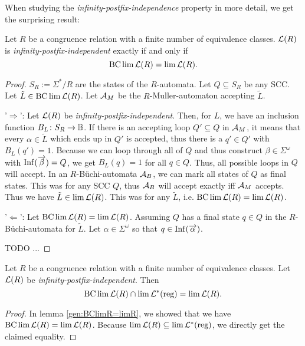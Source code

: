 When studying the \emph{infinity-postfix-independence} property in more detail, we get the surprising result:

\begin{lemma}
\label{gen:BClimR=limR}
Let $R$ be a congruence relation with a finite number of equivalence classes. $\mathcal{L}(R)$ is \emph{infinity-postfix-independent} exactly if and only if
\[ \operatorname{BC} \lim \mathcal{L}(R) = \lim \mathcal{L}(R) . \]
\begin{proof}
$S_R := \Sigma^*/R$ are the states of the $R$-automata. Let $Q \subseteq S_R$ be any SCC. Let $\tilde L \in \operatorname{BC} \lim \mathcal{L}(R)$. Let $\mathcal{A}_M$ be the $R$-Muller-automaton accepting $\tilde L$.

'$\Rightarrow$': Let $\mathcal{L}(R)$ be \emph{infinity-postfix-independent}. Then, for $L$, we have an inclusion function $B_L \colon S_R \rightarrow \mathbb{B}$. If there is an accepting loop $Q' \subseteq Q$ in $\mathcal{A}_M$, it means that every $\alpha \in \tilde L$ which ends up in $Q'$ is accepted, thus there is a $q' \in Q'$ with $B_L(q') = 1$. Because we can loop through all of $Q$ and thus construct $\beta \in \Sigma^\omega$ with $\operatorname{Inf}(\overrightarrow \beta) = Q$, we get $B_L(q) = 1$ for all $q \in Q$. Thus, all possible loops in $Q$ will accept. In an $R$-Büchi-automata $\mathcal{A}_B$, we can mark all states of $Q$ as final states. This was for any SCC $Q$, thus $\mathcal{A}_B$ will accept exactly iff $\mathcal{A}_M$ accepts. Thus we have $\tilde L \in \lim \mathcal{L}(R)$. This was for any $\tilde L$, i.e. $\operatorname{BC} \lim \mathcal{L}(R) = \lim \mathcal{L}(R)$.

'$\Leftarrow$': Let $\operatorname{BC} \lim \mathcal{L}(R) = \lim \mathcal{L}(R)$. Assuming $Q$ has a final state $q \in Q$ in the $R$-Büchi-automata for $\tilde L$. Let $\alpha \in \Sigma^\omega$ so that $q \in \operatorname{Inf}(\overrightarrow \alpha)$.

TODO ...
\end{proof}
\end{lemma}

\begin{lemma}
\label{gen:bcLimLReg-and-limL}
Let $R$ be a congruence relation with a finite number of equivalence classes. Let $\mathcal{L}(R)$ be \emph{infinity-postfix-independent}. Then
\[ \operatorname{BC} \lim \mathcal{L}(R) \cap \lim \mathcal{L}^*(\text{reg}) = \lim \mathcal{L}(R) . \]

\begin{proof}
In lemma \ref{gen:BClimR=limR}, we showed that we have $\operatorname{BC} \lim \mathcal{L}(R) = \lim \mathcal{L}(R)$. Because $\lim \mathcal{L}(R) \subseteq \lim \mathcal{L}^*(\text{reg})$, we directly get the claimed equality.
\end{proof}
\end{lemma}

